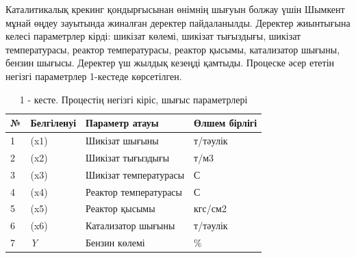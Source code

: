 \begin{multicols}{2}
Каталитикалық крекинг қондырғысынан өнімнің шығуын болжау үшін Шымкент
мұнай өңдеу зауытында жиналған деректер пайдаланылды. Деректер
жиынтығына келесі параметрлер кірді: шикізат көлемі, шикізат тығыздығы,
шикізат температурасы, реактор температурасы, реактор қысымы,
катализатор шығыны, бензин шығысы. Деректер үш жылдық кезеңді қамтыды.
Процеске әсер ететін негізгі параметрлер 1-кестеде көрсетілген.
\end{multicols}

\begin{table}[H]
\caption*{1 - кесте. Процестің негізгі кіріс, шығыс параметрлері}
\centering
\begin{tabular}{|l|l|l|l|}
\hline
№ & Белгіленуі & Параметр атауы        & Өлшем бірлігі \\ \hline
1 & (x1)       & Шикізат шығыны        & т/тәулік      \\ \hline
2 & (x2)       & Шикізат тығыздығы     & т/м3          \\ \hline
3 & (x3)       & Шикізат температурасы & С             \\ \hline
4 & (x4)       & Реактор температурасы & С             \\ \hline
5 & (x5)       & Реактор қысымы        & кгс/см2       \\ \hline
6 & (x6)       & Катализатор шығыны    & т/тәулік      \\ \hline
7 & \textit{Y} & Бензин көлемі         & \%            \\ \hline
\end{tabular}
\end{table}

